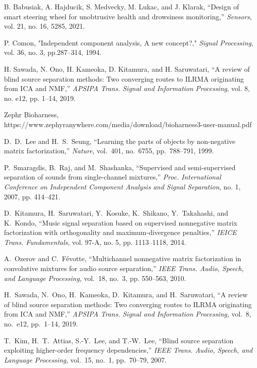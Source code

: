 \documentclass[honka]{nitkagawathesis}%
\begin{document}
\begin{thebibliography}{99}
  B. Babusiak, A. Hajducik, S. Medvecky, M. Lukac, and J. Klarak, ``Design of smart steering wheel for unobtrusive health and drowsiness monitoring,'' {\em Sensors}, 
  vol. 21, no. 16, 5285, 2021.

  P. Comon, "Independent component analysis, A new concept?," {\em Signal Processing}, vol. 36, no. 3, pp.287--314, 1994.

  H. Sawada, N. Ono, H. Kameoka, D. Kitamura, and H. Saruwatari, ``A review of
  blind source separation methods: Two converging routes to ILRMA originating from
  ICA and NMF,'' {\em APSIPA Trans. Signal and Information Processing}, vol. 8, no. e12,
  pp. 1–14, 2019.

   Zephr Bioharness, https://www.zephyranywhere.com/media/download/bioharness3-user-manual.pdf

  D.~D.~Lee and H.~S.~Seung,
  ``Learning the parts of objects by non-negative matrix factorization,''
  {\em Nature}, vol.~401, no.~6755, pp.~788--791, 1999.
  
  P.~Smaragdis, B.~Raj, and M.~Shashanka, 
  ``Supervised and semi-supervised separation of sounds from single-channel mixtures,''  
  {\em Proc. International Conference on Independent Component Analysis and Signal Separation}, no. 1, 2007, pp. 414–421.
  
  D.~Kitamura, H.~Saruwatari, Y.~Kosuke, K.~Shikano, Y.~Takahashi, and K.~Kondo, 
  ``Music signal separation based on supervised nonnegative matrix factorization with orthogonality and maximum-divergence penalties,'' 
  {\em IEICE Trans. Fundamentals}, vol. 97-A, no. 5, pp. 1113–1118, 2014.
  
  A.~Ozerov and C.~Févotte,
  ``Multichannel nonnegative matrix factorization in convolutive mixtures for audio source separation,'' 
  {\em IEEE Trans. Audio, Speech, and Language Processing,} vol.~18, no.~3, pp. 550--563, 2010.
  
  H.~Sawada, N.~Ono, H.~Kameoka, D.~Kitamura, and H.~Saruwatari, ``A review of blind source separation methods: Two converging routes to ILRMA originating from ICA and NMF,'' 
  {\em APSIPA Trans. Signal and Information Processing,} vol.~8, no.~e12, pp.~1--14, 2019.

  T.~Kim, H.~T.~Attias, S.-Y.~Lee, and T.-W.~Lee, ``Blind source separation exploiting higher-order frequency dependencies,'' 
  {\em IEEE Trans. Audio, Speech, and Language Processing}, vol.~15, no.~1, pp.~70--79, 2007.


\end{thebibliography}
\end{document}
